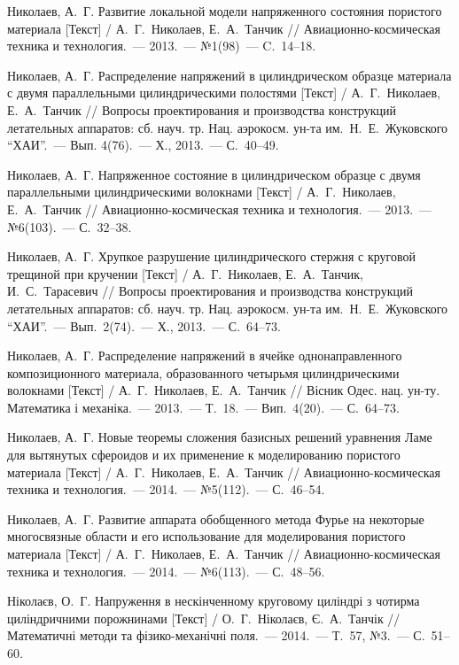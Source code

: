 \begin{biblist}{99}
Николаев, А.~Г. 
Развитие локальной модели напряженного состояния пористого материала [Текст] 
/ А.~Г.~Николаев, Е.~А.~Танчик 
// Авиационно-космическая техника и технология.~--- 2013.~--- №1(98)~--- C.~14--18.

Николаев, А.~Г. 
Распределение напряжений в цилиндрическом образце материала с двумя параллельными цилиндрическими полостями [Текст] 
/ А.~Г.~Николаев, Е.~А.~Танчик 
// Вопросы проектирования и производства конструкций летательных аппаратов: сб. науч. тр. Нац. аэрокосм. ун-та им.~Н.~Е.~Жуковского ``ХАИ''.~--- Вып. 4(76).~--- Х., 2013.~--- С.~40--49.

Николаев, А.~Г. 
Напряженное состояние в цилиндрическом образце с двумя параллельными цилиндрическими волокнами [Текст] 
/ А.~Г.~Николаев, Е.~А.~Танчик 
// Авиационно-космическая техника и технология.~--- 2013.~--- №6(103).~--- С.~32--38.

Николаев, А.~Г. 
Хрупкое разрушение цилиндрического стержня с круговой трещиной при кручении [Текст] 
/ А.~Г.~Николаев, Е.~А.~Танчик, И.~С.~Тарасевич 
// Вопросы проектирования и производства конструкций летательных аппаратов: сб. науч. тр. Нац. аэрокосм. ун-та им.~Н.~Е.~Жуковского ``ХАИ''.~--- Вып.~2(74).~--- Х., 2013.~--- С.~64--73.

Николаев, А.~Г. 
Распределение напряжений в ячейке однонаправленного композиционного материала, образованного четырьмя цилиндрическими волокнами [Текст] / А.~Г.~Николаев, Е.~А.~Танчик 
// Вісник Одес. нац. ун-ту. Математика і механіка.~--- 2013.~--- Т.~18.~--- Вип.~4(20).~--- С.~64--73.

Николаев, А.~Г. 
Новые теоремы сложения базисных решений уравнения Ламе для вытянутых сфероидов и их применение к моделированию пористого материала [Текст] 
/ А.~Г.~Николаев, Е.~А.~Танчик 
// Авиационно-космическая техника и технология.~--- 2014.~--- №5(112).~--- С.~46--54.

Николаев, А.~Г. 
Развитие аппарата обобщенного метода Фурье на некоторые многосвязные области и его использование для моделирования пористого материала [Текст] 
/ А.~Г.~Николаев, Е.~А.~Танчик 
// Авиационно-космическая техника и технология.~--- 2014.~--- №6(113).~--- С.~48--56.

Ніколаєв, О.~Г. 
Напруження в нескінченному круговому циліндрі з чотирма циліндричними порожнинами [Текст] 
/ О.~Г.~Ніколаєв, Є.~А.~Танчік 
// Математичні методи та фізико-механічні поля.~--- 2014.~--- Т.~57, №3.~--- С.~51--60.


\end{biblist}
